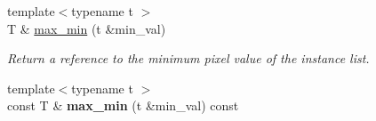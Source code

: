 \begin{DoxyCompactItemize}
\item 
\hypertarget{structcimg__library_1_1CImgList_aa17b9040f9296b7fe2d487a7d20e8eac}{
{\footnotesize template$<$typename t $>$ }\\T \& \hyperlink{structcimg__library_1_1CImgList_aa17b9040f9296b7fe2d487a7d20e8eac}{max\_\-min} (t \&min\_\-val)}
\label{structcimg__library_1_1CImgList_aa17b9040f9296b7fe2d487a7d20e8eac}

\begin{DoxyCompactList}\small\item\em Return a reference to the minimum pixel value of the instance list. \item\end{DoxyCompactList}\item 
\hypertarget{structcimg__library_1_1CImgList_a6c395452fd52c44306051def2da14251}{
{\footnotesize template$<$typename t $>$ }\\const T \& {\bfseries max\_\-min} (t \&min\_\-val) const }
\label{structcimg__library_1_1CImgList_a6c395452fd52c44306051def2da14251}

\end{DoxyCompactItemize}
